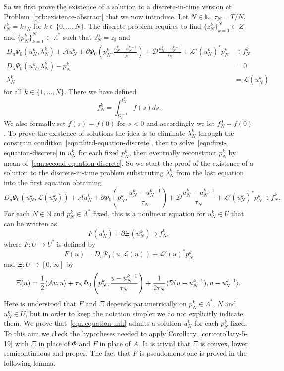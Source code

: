 \documentclass[a4paper,10pt,twoside]{amsbook}
\numberwithin{section}{chapter}
\numberwithin{equation}{chapter}
\theoremstyle{definition}
\DeclarePairedDelimiter{\dual}{\langle}{\rangle}
\begin{document}
So we first prove the existence of a solution to a discrete-in-time version of Problem~\ref{prb:existence-abstract} that we now introduce. Let $N\in\mathbb{N}$, $\tau_N=T/N$, $t_N^k=k\tau_N$ for $k\in\{0,\dots, N\}$. The discrete problem requires to find $\{z_N^k\}_{k=0}^N\subset Z$ and $\{p_N^k\}_{k=1}^N\subset\Lambda^*$ such that $z_N^0=z_0$ and
\begin{align}
\label{eqn:first-equation-discrete}
D_u\Psi_0(u_N^k,\lambda_N^k)+\mathcal{A}u_N^k+\partial\Phi_0\left(p_N^k,\frac{u_N^k-u_N^{k-1}}{\tau_N}\right)+\mathcal{D}\frac{u_N^k-u_N^{k-1}}{\tau_N}+\mathcal{L}'(u_N^k)^*p_N^k&\ni f_N^k \\
\label{eqn:second-equation-discrete}
D_\lambda\Psi_0(u_N^k,\lambda_N^k)-p_N^k&=0 \\
\label{eqn:third-equation-discrete}
\lambda_N^k&=\mathcal{L}(u_N^k)
\end{align}
for all $k\in\{1,\dots,N\}$. There we have defined
\[
f_N^k=\int_{t_N^{k-1}}^{t_N^k}f(s)ds.
\]
We also formally set $f(s)=f(0)$ for $s<0$ and accordingly we let $f_N^0=f(0)$. To prove the existence of solutions the idea is to eliminate $\lambda_N^k$ through the constrain condition~\eqref{eqn:third-equation-discrete}, then to solve~\eqref{eqn:first-equation-discrete} in $u_N^k$ for each fixed $p_N^k$, then eventually reconstruct $p_N^k$ by mean of~\eqref{eqn:second-equation-discrete}. So we start the proof of the existence of a solution to the discrete-in-time problem substituting $\lambda_N^k$ from the last equation into the first equation obtaining
\[
D_u\Psi_0(u_N^k,\mathcal{L}(u_N^k))+\mathcal{A}u_N^k+\partial\Phi_0\left(p_N^k,\frac{u_N^k-u_N^{k-1}}{\tau_N}\right)+\mathcal{D}\frac{u_N^k-u_N^{k-1}}{\tau_N}+\mathcal{L}'(u_N^k)^*p_N^k\ni f_N^k.
\]
For each $N\in\mathbb{N}$ and $p_N^k\in\Lambda^*$ fixed, this is a nonlinear equation for $u_N^k\in U$ that can be written as
\begin{equation}
\label{eqn:equation-unk}
F(u_N^k)+\partial\Xi(u_N^k)\ni f_N^k,
\end{equation}
where $F\colon U\to U^*$ is defined by
\[
F(u)=D_u\Psi_0(u,\mathcal{L}(u))+\mathcal{L}'(u)^*p_N^k
\]
and $\Xi\colon U\to[0,\infty]$ by
\[
\Xi(u)=\frac{1}{2}\dual{\mathcal{A}u,u}+\tau_N\Phi_0\left(p_N^k,\frac{u-u_N^{k-1}}{\tau_N}\right)+\frac{1}{2\tau_N}\dual{\mathcal{D}(u-u_N^{k-1}),u-u_N^{k-1}}.
\]
Here is understood that $F$ and $\Xi$ depends parametrically on $p_N^k\in\Lambda^*$, $N$ and $u_N^k\in U$, but in order to keep the notation simpler we do not explicitly indicate them. We prove that~\eqref{eqn:equation-unk} admits a solution $u_N^k$ for each $p_N^k$ fixed. To this aim we check the hypotheses needed to apply Corollary~\ref{cor:corollary-5-19} with $\Xi$ in place of $\Phi$ and $F$ in place of $A$. It is trivial that $\Xi$ is convex, lower semicontinuous and proper. The fact that $F$ is pseudomonotone is proved in the following lemma.
\end{document}
